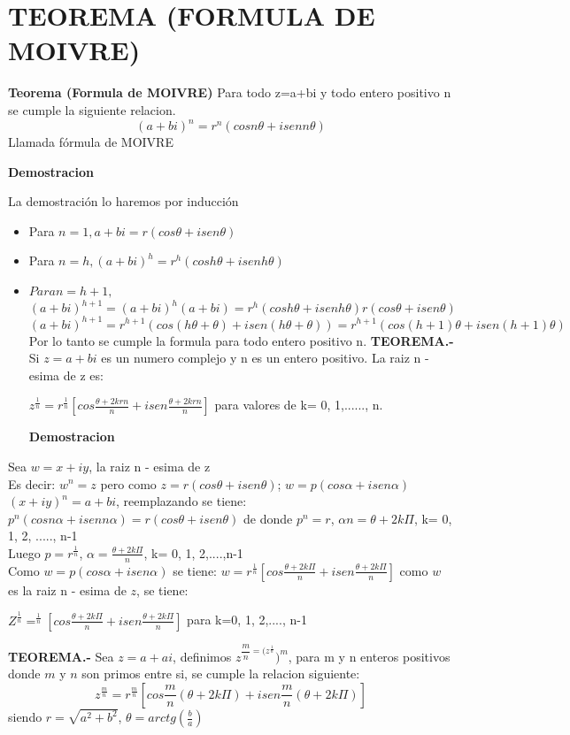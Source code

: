 \documentclass[10pt,a4paper]{book}
\begin{document}
\section{TEOREMA (FORMULA DE MOIVRE)}
\begin{small}
\textbf{Teorema (Formula de MOIVRE)}
Para todo z=a+bi y todo entero positivo n se cumple la siguiente relacion.
$$(a+bi)^{n}=r^{n}(cos n\theta+isen n \theta)$$
Llamada fórmula de MOIVRE
\begin{center}
\textbf{Demostracion}
\end{center}
La demostración lo haremos por inducción
\begin{itemize}
\item Para $n=1, a+bi= r(cos\theta + i sen\theta)$
\item Para $n=h, (a+bi)^{h}=r^{h}(cosh\theta + i senh\theta)$
\item $Para n=h+1,$
$$(a+bi)^{h+1}=(a+bi)^{h}(a+bi)=r^{h}(cosh\theta + i senh\theta)r(cos\theta + i sen\theta)$$
$$(a+bi)^{h+1}=r^{h+1}(cos(h\theta+\theta)+
isen(h\theta+\theta))=r^{h+1}(cos(h+1)\theta+isen(h+1)\theta)$$
Por lo tanto se cumple la formula para todo entero positivo n.
\textbf{TEOREMA.-} Si $z=a+bi$ es un numero complejo y n es un entero positivo. La raiz n - esima de z es:\\
\begin{center}
$z^{\frac{1}{n}}=r^{\frac{1}{n}}[cos \frac{\theta+2kr{n}}{n}+isen\frac{\theta+2kr{n}}{n}]$ para valores de k= 0, 1,......, n.

\textbf{Demostracion}
\end{center}

\end{itemize}
Sea $w=x+iy$, la raiz n - esima de z\\
Es decir: $w^{n}=z$ pero como $z=r(cos\theta+isen\theta)$; $w=p(cos\alpha + isen\alpha)$ $(x+iy)^{n}=a+bi$, reemplazando se tiene: $p^{n}(cos n\alpha+i sen n\alpha)=r(cos\theta + isen\theta)$ de donde $p^{n}=r$, $\alpha n=\theta+2k\Pi$, k= 0, 1, 2, ....., n-1\\
Luego $p=r^{\frac{1}{n}}$, $\alpha=\frac{\theta+2k\Pi}{n}$, k= 0, 1, 2,....,n-1\\
Como $w=p(cos \alpha + i sen \alpha)$ se tiene: $w=r^{\frac{1}{n}}[cos \frac{\theta+2k\Pi}{n}+i sen\frac{\theta+2k\Pi}{n}]$ como $w$ es la raiz n - esima de $z$, se tiene:
\begin{center}
$Z^{\frac{1}{n}}=^{\frac{1}{n}}[cos\frac{\theta+2k\Pi}{n}+isen\frac{\theta+2k\Pi}{n}]$ para k=0, 1, 2,...., n-1
\end{center}
\textbf{TEOREMA.-} Sea $z=a+ai$, definimos $z^{\dfrac{m}{n}=(z^{\frac{1}{n}}})^{m}$, para m y n enteros positivos donde $m$ y $n$ son primos entre si, se cumple la relacion siguiente:
$$z^{\frac{m}{n}}=r^{\frac{m}{n}}[cos\frac{m}{n}(\theta+2k\Pi)+isen\frac{m}{n}(\theta+2k\Pi)]$$
siendo $r=\sqrt{a^{2}+b^{2}}$, $\theta=arctg(\frac{b}{a})$

\end{small}
\end{document}
